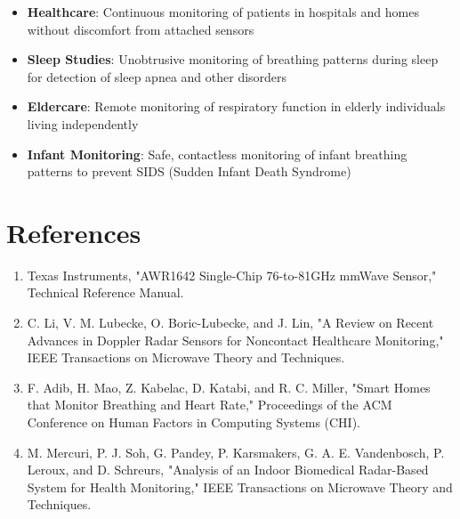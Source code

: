 \documentclass[12pt]{article}
\begin{document}
\begin{itemize}
    \item \textbf{Healthcare}: Continuous monitoring of patients in hospitals and homes without discomfort from attached sensors
    
    \item \textbf{Sleep Studies}: Unobtrusive monitoring of breathing patterns during sleep for detection of sleep apnea and other disorders
    
    \item \textbf{Eldercare}: Remote monitoring of respiratory function in elderly individuals living independently
    
    \item \textbf{Infant Monitoring}: Safe, contactless monitoring of infant breathing patterns to prevent SIDS (Sudden Infant Death Syndrome)
\end{itemize}

\section{References}

\begin{enumerate}
    \item Texas Instruments, "AWR1642 Single-Chip 76-to-81GHz mmWave Sensor," Technical Reference Manual.
    
    \item C. Li, V. M. Lubecke, O. Boric-Lubecke, and J. Lin, "A Review on Recent Advances in Doppler Radar Sensors for Noncontact Healthcare Monitoring," IEEE Transactions on Microwave Theory and Techniques.
    
    \item F. Adib, H. Mao, Z. Kabelac, D. Katabi, and R. C. Miller, "Smart Homes that Monitor Breathing and Heart Rate," Proceedings of the ACM Conference on Human Factors in Computing Systems (CHI).
    
    \item M. Mercuri, P. J. Soh, G. Pandey, P. Karsmakers, G. A. E. Vandenbosch, P. Leroux, and D. Schreurs, "Analysis of an Indoor Biomedical Radar-Based System for Health Monitoring," IEEE Transactions on Microwave Theory and Techniques.
\end{enumerate}
\end{document}

